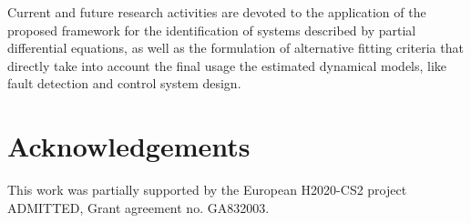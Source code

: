 \documentclass{article} %
\begin{document}
Current and future research activities are devoted to the application of the proposed framework  for the identification of  systems described by partial differential equations, as well as the formulation  of alternative fitting criteria that directly take into account the final usage the estimated dynamical models, like fault detection and control system design.

\section*{Acknowledgements}
This work was partially supported by the European H2020-CS2 project ADMITTED, Grant agreement no. GA832003.


\end{document}
